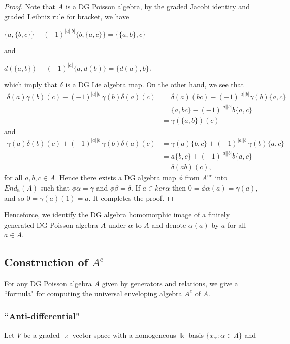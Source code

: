 \documentclass[a4paper,10pt]{amsart}
\theoremstyle{definition}
\theoremstyle{remark}
\numberwithin{equation}{section}
\begin{document}
\begin{proof}
Note that $A$ is a DG Poisson algebra, by the graded Jacobi
identity and graded Leibniz rule for bracket, we have
\begin{center}
 $\{a, \{b, c\}\}-(-1)^{|a||b|}\{b, \{a, c\}\}=\{\{a, b\}, c\}$
\end{center}
and
\begin{center}
 $d(\{a, b\})-(-1)^{|a|}\{a, d(b)\}=\{d(a), b\}$,
\end{center}
which imply that $\delta$ is a DG Lie algebra map. On the other hand, we see
that
\begin{equation}
\begin{split}
\delta(a)\gamma(b)(c)-(-1)^{|a||b|}\gamma(b)\delta(a)(c)&=\delta(a)(bc)-(-1)^{|a||b|}\gamma(b)\{a,
c\} \\&=\{a, bc\}-(-1)^{|a||b|}b\{a, c\}\\&=\gamma(\{a, b\})(c)
\end{split}\nonumber
\end{equation}
and
\begin{equation}
\begin{split}
\gamma(a)\delta(b)(c)+(-1)^{|a||b|}\gamma(b)\delta(a)(c)&=\gamma(a)\{b,
c\}+(-1)^{|a||b|}\gamma(b)\{a, c\}\\&=a\{b, c\}+(-1)^{|a||b|}b\{a,
c\}\\&=\delta(ab)(c),
\end{split}\nonumber
\end{equation}
for all $a, b, c\in A$. Hence there exists a DG algebra map $\phi$
from $A^{ue}$ into $End_{\Bbbk}(A)$ such that $\phi\alpha=\gamma$
and $\phi\beta=\delta$. If $a\in ker\alpha$ then
$0=\phi\alpha(a)=\gamma(a)$, and so $0=\gamma(a)(1)=a$. It completes
the proof.
\end{proof}

Henceforce, we identify the DG algebra homomorphic image of a
finitely generated DG Poisson algebra $A$ under $\alpha$ to $A$ and
denote $\alpha(a)$ by $a$ for all $a\in A$.

\subsection{Construction of $A^e$} For any DG Poisson algebra $A$
given by generators and relations, we give a ``formula" for
computing the universal enveloping algebra $A^e$ of $A$.

\subsubsection{``Anti-differential"} Let $V$ be a graded
$\Bbbk$-vector space with a homogeneous $\Bbbk$-basis
$\{x_{\alpha}: \alpha\in \Lambda\}$ and
\end{document}

